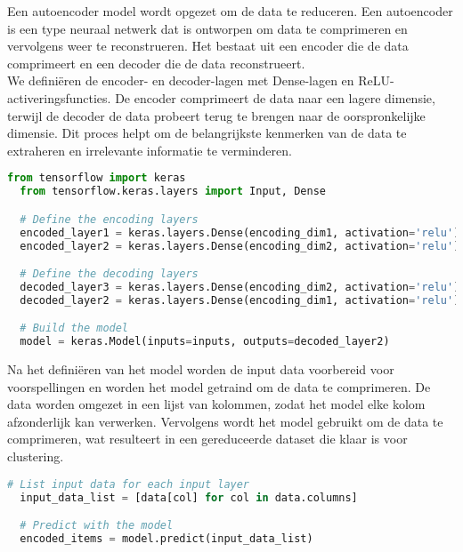 Een autoencoder model wordt opgezet om de data te reduceren. Een autoencoder is een type neuraal netwerk dat is ontworpen om data te comprimeren en vervolgens weer te reconstrueren. Het bestaat uit een encoder die de data comprimeert en een decoder die de data reconstrueert.
\\We definiëren de encoder- en decoder-lagen met Dense-lagen en ReLU-activeringsfuncties. De encoder comprimeert de data naar een lagere dimensie, terwijl de decoder de data probeert terug te brengen naar de oorspronkelijke dimensie. Dit proces helpt om de belangrijkste kenmerken van de data te extraheren en irrelevante informatie te verminderen.
\begin{lstlisting}[language=Python, caption={Opzetten van het autoencoder model}]
  from tensorflow import keras
  from tensorflow.keras.layers import Input, Dense

  # Define the encoding layers
  encoded_layer1 = keras.layers.Dense(encoding_dim1, activation='relu')(preprocessed_inputs[0])
  encoded_layer2 = keras.layers.Dense(encoding_dim2, activation='relu')(encoded_layer1)

  # Define the decoding layers
  decoded_layer3 = keras.layers.Dense(encoding_dim2, activation='relu')(encoded_layer2)
  decoded_layer2 = keras.layers.Dense(encoding_dim1, activation='relu')(decoded_layer3)

  # Build the model
  model = keras.Model(inputs=inputs, outputs=decoded_layer2)
\end{lstlisting}


Na het definiëren van het model worden de input data voorbereid voor voorspellingen en worden het model getraind om de data te comprimeren. De data worden omgezet in een lijst van kolommen, zodat het model elke kolom afzonderlijk kan verwerken. Vervolgens wordt het model gebruikt om de data te comprimeren, wat resulteert in een gereduceerde dataset die klaar is voor clustering.
\begin{lstlisting}[language=Python, caption={Trainen van het model}]
  # List input data for each input layer
  input_data_list = [data[col] for col in data.columns]

  # Predict with the model
  encoded_items = model.predict(input_data_list)
\end{lstlisting}

\section{}%
\label{sec:clusteringPOC}

